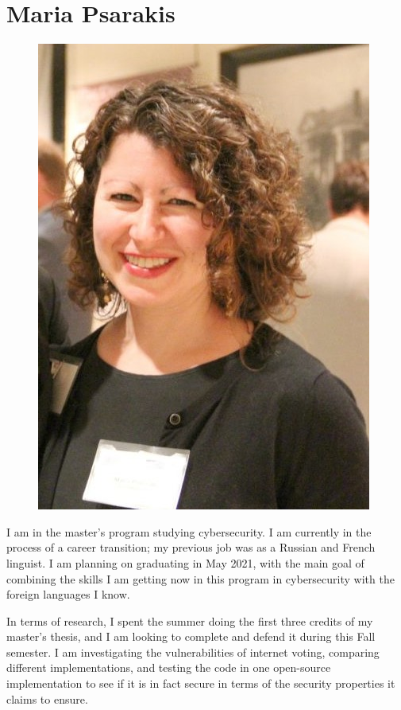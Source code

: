 \section{Maria Psarakis}
\begin{figure}
    \centering
    \includegraphics[scale=0.5]{mpsaraki.jpg}
\end{figure}

I am in the master's program studying cybersecurity. I am currently in the process of a career transition; my previous job was as a Russian and French linguist. I am planning on graduating in May 2021, with the main goal of combining the skills I am getting now in this program in cybersecurity with the foreign languages I know.

In terms of research, I spent the summer doing the first three credits of my master's thesis, and I am looking to complete and defend it during this Fall semester. I am investigating the vulnerabilities of internet voting, comparing different implementations, and testing the code in one open-source implementation to see if it is in fact secure in terms of the security properties it claims to ensure.

